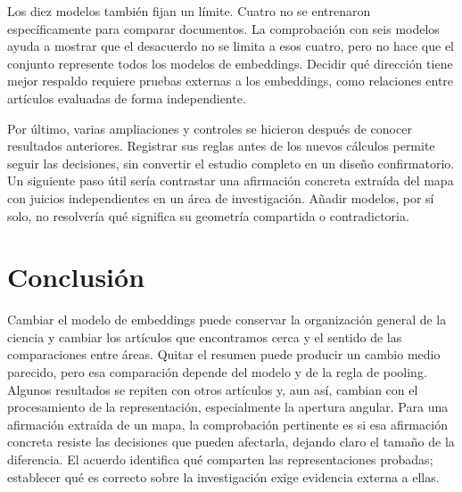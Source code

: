 \documentclass[12pt]{article}
\begin{document}
Los diez modelos también fijan un límite. Cuatro no se entrenaron específicamente para comparar documentos. La comprobación con seis modelos ayuda a mostrar que el desacuerdo no se limita a esos cuatro, pero no hace que el conjunto represente todos los modelos de embeddings. Decidir qué dirección tiene mejor respaldo requiere pruebas externas a los embeddings, como relaciones entre artículos evaluadas de forma independiente.

Por último, varias ampliaciones y controles se hicieron después de conocer resultados anteriores. Registrar sus reglas antes de los nuevos cálculos permite seguir las decisiones, sin convertir el estudio completo en un diseño confirmatorio. Un siguiente paso útil sería contrastar una afirmación concreta extraída del mapa con juicios independientes en un área de investigación. Añadir modelos, por sí solo, no resolvería qué significa su geometría compartida o contradictoria.

\section{Conclusión}
Cambiar el modelo de embeddings puede conservar la organización general de la ciencia y cambiar los artículos que encontramos cerca y el sentido de las comparaciones entre áreas. Quitar el resumen puede producir un cambio medio parecido, pero esa comparación depende del modelo y de la regla de pooling. Algunos resultados se repiten con otros artículos y, aun así, cambian con el procesamiento de la representación, especialmente la apertura angular. Para una afirmación extraída de un mapa, la comprobación pertinente es si esa afirmación concreta resiste las decisiones que pueden afectarla, dejando claro el tamaño de la diferencia. El acuerdo identifica qué comparten las representaciones probadas; establecer qué es correcto sobre la investigación exige evidencia externa a ellas.
\end{document}
